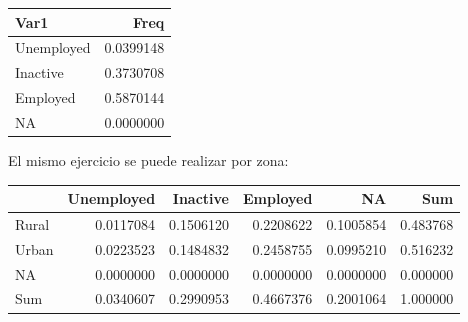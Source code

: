 \documentclass[
  12pt,
]{book}
\newenvironment{Shaded}{\begin{snugshade}}{\end{snugshade}}
\newcommand{\AttributeTok}[1]{\textcolor[rgb]{0.77,0.63,0.00}{#1}}
\newcommand{\FunctionTok}[1]{\textcolor[rgb]{0.00,0.00,0.00}{#1}}
\newcommand{\NormalTok}[1]{#1}
\newcommand{\SpecialCharTok}[1]{\textcolor[rgb]{0.00,0.00,0.00}{#1}}
\newcommand{\StringTok}[1]{\textcolor[rgb]{0.31,0.60,0.02}{#1}}
\begin{document}
\begin{Shaded}
\end{Shaded}

\begin{tabular}{l|r}
\hline
Var1 & Freq\\
\hline
Unemployed & 0.0399148\\
\hline
Inactive & 0.3730708\\
\hline
Employed & 0.5870144\\
\hline
NA & 0.0000000\\
\hline
\end{tabular}

El mismo ejercicio se puede realizar por zona:

\begin{Shaded}
\end{Shaded}

\begin{tabular}{l|r|r|r|r|r}
\hline
  & Unemployed & Inactive & Employed & NA & Sum\\
\hline
Rural & 0.0117084 & 0.1506120 & 0.2208622 & 0.1005854 & 0.483768\\
\hline
Urban & 0.0223523 & 0.1484832 & 0.2458755 & 0.0995210 & 0.516232\\
\hline
NA & 0.0000000 & 0.0000000 & 0.0000000 & 0.0000000 & 0.000000\\
\hline
Sum & 0.0340607 & 0.2990953 & 0.4667376 & 0.2001064 & 1.000000\\
\hline
\end{tabular}

\begin{Shaded}
\end{Shaded}
\end{document}
